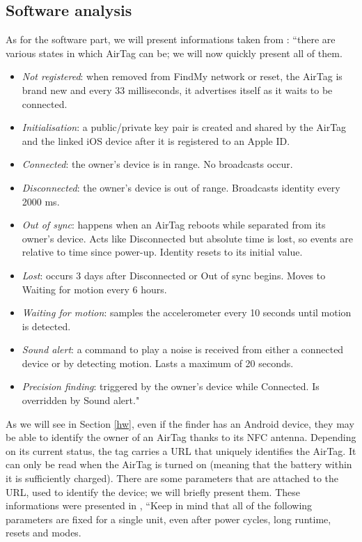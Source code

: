 \documentclass[english]{article}
\begin{document}
\subsection{Software analysis}\label{sec:beacons}
As for the software part, we will present informations taken from \cite{reverse}: ``there are various states in which AirTag can be; we will now quickly present all of them.
\begin{itemize}
  \item \textit{Not registered}: when removed from FindMy network or reset, the AirTag is brand new and every 33 milliseconds, it advertises itself as it waits to be connected.
  \item \textit{Initialisation}: a public/private key pair is created and shared by the AirTag and the linked iOS device after it is registered to an Apple ID.
  \item \textit{Connected}: the owner’s device is in range. No broadcasts occur.
  \item \textit{Disconnected}: the owner’s device is out of range. Broadcasts identity every 2000 ms.
  \item \textit{Out of sync}: happens when an AirTag reboots while separated from its owner’s device. Acts like Disconnected but absolute time is lost, so events are relative to time since power-up. Identity resets to its initial value.
  \item \textit{Lost}: occurs 3 days after Disconnected or Out of sync begins. Moves to Waiting for motion every 6 hours.
  \item \textit{Waiting for motion}: samples the accelerometer every 10 seconds until motion is detected.
  \item \textit{Sound alert}: a command to play a noise is received from either a connected device or by detecting motion. Lasts a maximum of 20 seconds.
  \item \textit{Precision finding}: triggered by the owner’s device while Connected. Is overridden by Sound alert."
\end{itemize}
As we will see in Section \ref{hw}, even if the finder has an Android device, they may be able to identify the owner of an AirTag thanks to its NFC antenna. Depending on its current status, the tag carries a URL that uniquely identifies the AirTag. It can only be read when the AirTag is turned on (meaning that the battery within it is sufficiently charged). There are some parameters that are attached to the URL, used to identify the device; we will briefly present them. These informations were presented in \cite{reverse}, ``Keep in mind that all of the following parameters are fixed for a single unit, even after power cycles, long runtime, resets and modes.
\end{document}
